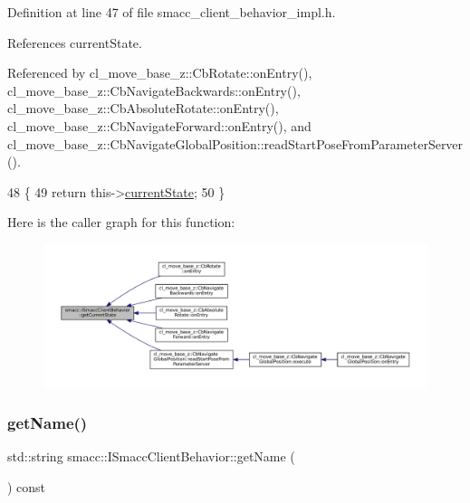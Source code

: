 Definition at line 47 of file smacc\+\_\+client\+\_\+behavior\+\_\+impl.\+h.



References current\+State.



Referenced by cl\+\_\+move\+\_\+base\+\_\+z\+::\+Cb\+Rotate\+::on\+Entry(), cl\+\_\+move\+\_\+base\+\_\+z\+::\+Cb\+Navigate\+Backwards\+::on\+Entry(), cl\+\_\+move\+\_\+base\+\_\+z\+::\+Cb\+Absolute\+Rotate\+::on\+Entry(), cl\+\_\+move\+\_\+base\+\_\+z\+::\+Cb\+Navigate\+Forward\+::on\+Entry(), and cl\+\_\+move\+\_\+base\+\_\+z\+::\+Cb\+Navigate\+Global\+Position\+::read\+Start\+Pose\+From\+Parameter\+Server().


\begin{DoxyCode}
48 \{
49     \textcolor{keywordflow}{return} this->\hyperlink{classsmacc_1_1ISmaccClientBehavior_a5a6658a2deb72b700ae595e594617616}{currentState};
50 \}
\end{DoxyCode}
Here is the caller graph for this function\+:
\nopagebreak
\begin{figure}[H]
\begin{center}
\leavevmode
\includegraphics[width=350pt]{classsmacc_1_1ISmaccClientBehavior_a34fde34e48fa13db622ee60d8374d0b8_icgraph}
\end{center}
\end{figure}
\mbox{\label{classsmacc_1_1ISmaccClientBehavior_a18e4bec9460b010f2894c0f7e7064a34}} 
\subsubsection{\texorpdfstring{get\+Name()}{getName()}}
{\footnotesize\ttfamily std\+::string smacc\+::\+I\+Smacc\+Client\+Behavior\+::get\+Name (\begin{DoxyParamCaption}{ }\end{DoxyParamCaption}) const}




